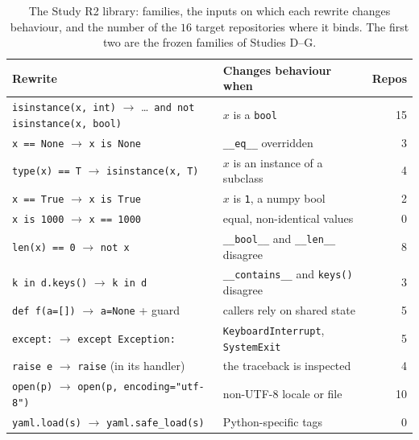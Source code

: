 \begin{table}[t]
\caption{The Study R2 library: families, the inputs on which each rewrite changes behaviour, and the number of the $16$ target
repositories where it binds.  The first two are the frozen families of Studies D--G.}
\label{tab:library}
\footnotesize
\begin{tabular}{@{}llr@{}}
\toprule
Rewrite & Changes behaviour when & Repos \\
\midrule
\texttt{isinstance(x, int)} $\to$ \dots\ \texttt{and not isinstance(x, bool)} & $x$ is a \texttt{bool} & 15 \\
\texttt{x == None} $\to$ \texttt{x is None} & \texttt{\_\_eq\_\_} overridden & 3 \\
\texttt{type(x) == T} $\to$ \texttt{isinstance(x, T)} & $x$ is an instance of a subclass & 4 \\
\texttt{x == True} $\to$ \texttt{x is True} & $x$ is \texttt{1}, a numpy bool & 2 \\
\texttt{x is 1000} $\to$ \texttt{x == 1000} & equal, non-identical values & 0 \\
\texttt{len(x) == 0} $\to$ \texttt{not x} & \texttt{\_\_bool\_\_} and \texttt{\_\_len\_\_} disagree & 8 \\
\texttt{k in d.keys()} $\to$ \texttt{k in d} & \texttt{\_\_contains\_\_} and \texttt{keys()} disagree & 3 \\
\texttt{def f(a=[])} $\to$ \texttt{a=None} + guard & callers rely on shared state & 5 \\
\texttt{except:} $\to$ \texttt{except Exception:} & \texttt{KeyboardInterrupt}, \texttt{SystemExit} & 5 \\
\texttt{raise e} $\to$ \texttt{raise} (in its handler) & the traceback is inspected & 4 \\
\texttt{open(p)} $\to$ \texttt{open(p, encoding="utf-8")} & non-UTF-8 locale or file & 10 \\
\texttt{yaml.load(s)} $\to$ \texttt{yaml.safe\_load(s)} & Python-specific tags & 0 \\
\bottomrule
\end{tabular}
\end{table}

